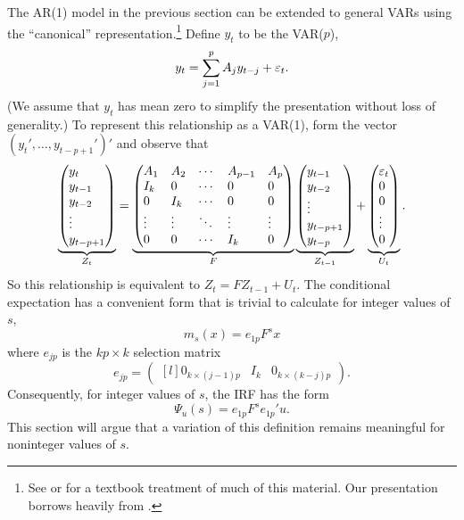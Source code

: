 \documentclass[12pt,fleqn]{article}
\begin{document}
The AR(1) model in the previous section can be extended to general
VARs using the ``canonical'' representation.\footnote{%
  See \citet{Ham:94} or \citet{HaS:13} for a textbook treatment of
  much of this material. Our presentation borrows heavily from
  \citet{Ham:94}.} %
Define $y_t$ to be the VAR($p$),
\[
y_t = \sum_{j=1}^p A_j y_{t-j} + \varepsilon_t.
\]
(We assume that $y_t$ has mean zero to simplify the presentation
without loss of generality.) To represent this relationship as a
VAR(1), form the vector $(y_t',\dots,y_{t-p+1}')'$ and observe
that
\begin{equation}
\label{eq:7}
\underbrace{\begin{pmatrix*}[l]
  y_t \\ y_{t-1} \\ y_{t-2} \\ \vdots \\ y_{t-p+1}
\end{pmatrix*}}_{Z_t}
=
\underbrace{\begin{pmatrix*}[l]
  A_1 & A_2 & \cdots & A_{p-1} & A_p \\
  I_k & 0   & \cdots & 0 & 0 \\
  0  & I_k  & \cdots & 0 & 0 \\
  \vdots & \vdots & \ddots & \vdots & \vdots \\
  0 & 0 & \cdots & I_k & 0
\end{pmatrix*}}_{F}
\underbrace{\begin{pmatrix*}[l]
  y_{t-1} \\ y_{t-2} \\ \vdots \\ y_{t-p+1} \\ y_{t-p}
\end{pmatrix*}}_{Z_{t-1}}
+
\underbrace{\begin{pmatrix*}[l]
  \vep_{t} \\ 0 \\ 0 \\ \vdots \\ 0
\end{pmatrix*}}_{U_t}.
\end{equation}
So this relationship is equivalent to $Z_t = F Z_{t-1} + U_t$. The
conditional expectation has a convenient form that is trivial to
calculate for integer values of $s$,
\begin{equation*}
  m_s(x) = e_{1p} F^s x
\end{equation*}
where $e_{jp}$ is the $k p \times k$ selection matrix
\begin{equation*}
  e_{jp} = \begin{pmatrix*}[l]
    0_{k \times (j-1)p} & I_k & 0_{k \times (k - j)p}
  \end{pmatrix*}.
\end{equation*}
Consequently, for integer values of $s$, the IRF has the form
\begin{equation*}
  \Psi_u(s) = e_{1p} F^s e_{1p}' u.
\end{equation*}
This section will argue that a variation of
this definition remains meaningful for noninteger values of $s$.
\end{document}
